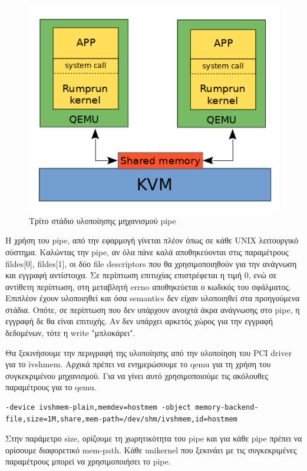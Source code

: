 \begin{figure}[htp]
\centering
\includegraphics[scale=0.7]{figures/pipe_stage3.png}
\caption{Τρίτο στάδιο υλοποίησης μηχανισμού pipe\label{fig4_4}}
\end{figure}

Η χρήση του pipe, από την εφαρμογή γίνεται πλέον όπως σε κάθε UNIX λειτουργικό
σύστημα. Καλώντας την pipe, αν όλα πάνε καλά αποθηκεύονται στις
παραμέτρους fildes[0], fildes[1], οι δύο file descriptors που θα χρησιμοποιηθούν
για την ανάγνωση και εγγραφή αντίστοιχα. Σε περίπτωση επιτυχίας επιστρέφεται η
τιμή 0, ενώ σε αντίθετη περίπτωση, στη μεταβλητή errno αποθηκεύεται ο κωδικός
του σφάλματος. Επιπλέον έχουν υλοποιηθεί και όσα semantics δεν είχαν υλοποιηθεί
στα προηγούμενα στάδια. Οπότε, σε περίπτωση που δεν υπάρχουν ανοιχτά άκρα
ανάγνωσης στο pipe, η εγγραφή δε θα είναι επιτυχής. Αν δεν υπάρχει αρκετός χώρος
για την εγγραφή δεδομένων, τότε η write "μπλοκάρει".

Θα ξεκινήσουμε την περιγραφή της υλοποίησης από την υλοποίηση του PCI driver για
το ivshmem. Αρχικά πρέπει να ενημερώσουμε το qemu για τη χρήση του συγκεκριμένου
μηχανισμού. Για να γίνει αυτό χρησιμοποιούμε τις ακόλουθες παραμέτρους για το qemu.
\begin{lstlisting}[numbers=none]
-device ivshmem-plain,memdev=hostmem -object memory-backend-file,size=1M,share,mem-path=/dev/shm/ivshmem,id=hostmem
\end{lstlisting}
Στην παράμετρο size, ορίζουμε τη χωρητικότητα του pipe και για κάθε pipe πρέπει
να ορίσουμε διαφορετικό mem-path. Κάθε unikernel που ξεκινάει με τις
συγκεκριμένες παραμέτρους μπορεί να χρησιμοποιήσει το pipe. 

